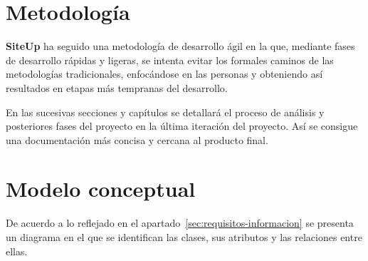 
\section{Metodología}
\textbf{SiteUp} ha seguido una metodología de desarrollo ágil en la que,
mediante fases de desarrollo rápidas y ligeras, se intenta evitar los formales
caminos de las metodologías tradicionales, enfocándose en las personas y
obteniendo así resultados en etapas más tempranas del desarrollo.

En las sucesivas secciones y capítulos se detallará el proceso de análisis y
posteriores fases del proyecto en la última iteración del proyecto. Así se
consigue una documentación más concisa y cercana al producto final.

\section{Modelo conceptual}

De acuerdo a lo reflejado en el apartado~\ref{sec:requisitos-informacion} se
presenta un diagrama en el que se identifican las clases, sus atributos y las
relaciones entre ellas.







